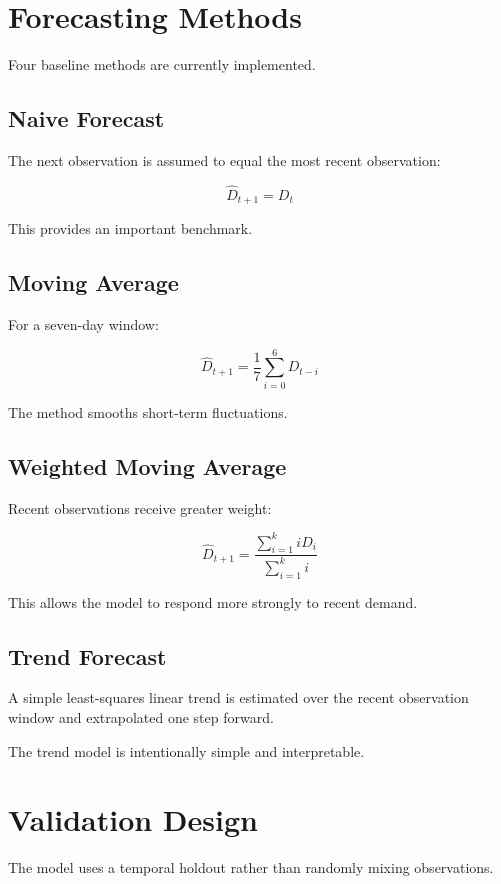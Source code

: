 \documentclass[11pt,a4paper]{article}
\begin{document}
\section{Forecasting Methods}

Four baseline methods are currently implemented.

\subsection{Naive Forecast}

The next observation is assumed to equal the most recent observation:

\[
\hat{D}_{t+1}=D_t
\]

This provides an important benchmark.

\subsection{Moving Average}

For a seven-day window:

\[
\hat{D}_{t+1}
=
\frac{1}{7}
\sum_{i=0}^{6}D_{t-i}
\]

The method smooths short-term fluctuations.

\subsection{Weighted Moving Average}

Recent observations receive greater weight:

\[
\hat{D}_{t+1}
=
\frac{
\sum_{i=1}^{k}iD_i
}{
\sum_{i=1}^{k}i
}
\]

This allows the model to respond more strongly to recent demand.

\subsection{Trend Forecast}

A simple least-squares linear trend is estimated over the recent
observation window and extrapolated one step forward.

The trend model is intentionally simple and interpretable.

\section{Validation Design}

The model uses a temporal holdout rather than randomly mixing observations.
\end{document}
